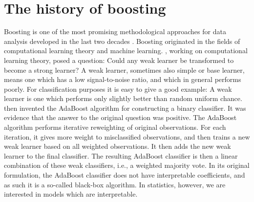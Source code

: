 \section{The history of boosting}\label{history}
Boosting is one of the most promising methodological approaches for data analysis developed in the last two decades \citep{mayr14a}. Boosting originated in the fields of computational learning theory and machine learning. \cite{kearnsvaliant}, working on computational learning theory, posed a question: Could any weak learner be transformed to become a strong learner? A weak learner, sometimes also simple or base learner, means one which has a low signal-to-noise ratio, and which in general performs poorly. For classification purposes it is easy to give a good example: A weak learner is one which performs only slightly better than random uniform chance. \cite{adaboost} then invented the AdaBoost algorithm for constructing a binary classifier. It was evidence that the answer to the original question was positive. The AdaBoost algorithm performs iterative reweighting of original observations. For each iteration, it gives more weight to misclassified observations, and then trains a new weak learner based on all weighted observations. It then adds the new weak learner to the final classifier. The resulting AdaBoost classifier is then a linear combination of these weak classifiers, i.e., a weighted majority vote. In its original formulation, the AdaBoost classifier does not have interpretable coefficients, and as such it is a so-called black-box algorithm. In statistics, however, we are interested in models which are interpretable.

